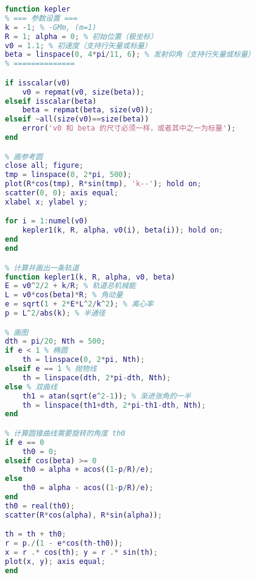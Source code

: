 \begin{lstlisting}[language=matlab]
% 已知初始位置、发射速度、发射方向， 求轨道以及运动方程
function kepler
% === 参数设置 ===
k = -1; % -GMm, (m=1)
R = 1; alpha = 0; % 初始位置（极坐标）
v0 = 1.1; % 初速度（支持行矢量或标量）
beta = linspace(0, 4*pi/11, 6); % 发射仰角（支持行矢量或标量）
% ==============

if isscalar(v0)
    v0 = repmat(v0, size(beta));
elseif isscalar(beta)
    beta = repmat(beta, size(v0));
elseif ~all(size(v0)==size(beta))
    error('v0 和 beta 的尺寸必须一样，或者其中之一为标量');
end

% 画参考圆
close all; figure;
tmp = linspace(0, 2*pi, 500);
plot(R*cos(tmp), R*sin(tmp), 'k--'); hold on;
scatter(0, 0); axis equal;
xlabel x; ylabel y;

for i = 1:numel(v0)
    kepler1(k, R, alpha, v0(i), beta(i)); hold on;
end
end

% 计算并画出一条轨道
function kepler1(k, R, alpha, v0, beta)
E = v0^2/2 + k/R; % 轨道总机械能
L = v0*cos(beta)*R; % 角动量
e = sqrt(1 + 2*E*L^2/k^2); % 离心率
p = L^2/abs(k); % 半通径

% 画图
dth = pi/20; Nth = 500;
if e < 1 % 椭圆
    th = linspace(0, 2*pi, Nth);
elseif e == 1 % 抛物线
    th = linspace(dth, 2*pi-dth, Nth);
else % 双曲线
    th1 = atan(sqrt(e^2-1)); % 渐进张角的一半
    th = linspace(th1+dth, 2*pi-th1-dth, Nth);
end

% 计算圆锥曲线需要旋转的角度 th0
if e == 0
    th0 = 0;
elseif cos(beta) >= 0
    th0 = alpha + acos((1-p/R)/e);
else
    th0 = alpha - acos((1-p/R)/e);
end
th0 = real(th0);
scatter(R*cos(alpha), R*sin(alpha));

th = th + th0;
r = p./(1 - e*cos(th-th0));
x = r .* cos(th); y = r .* sin(th);
plot(x, y); axis equal;
end
\end{lstlisting}
